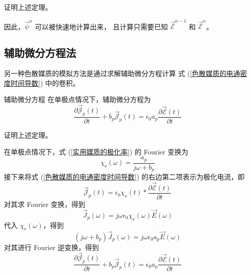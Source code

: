 \begin{exercise}
    证明上述定理。
\end{exercise}

\par 因此，$\vec{\psi}^n$ 可以被快速地计算出来，
且计算只需要已知 $\vec{\mathscr{E}}^{n-1}$ 和
$\vec{\mathscr{E}}^{n}$。

\subsection{辅助微分方程法}

\par 另一种色散媒质的模拟方法是通过求解辅助微分方程计算
式 (\ref{色散媒质的电通密度时间导数}) 中的卷积。

\begin{theorem}{辅助微分方程}
    在单极点情况下，辅助微分方程为
    \begin{equation}
        \frac{\partial \vec{\mathscr{J}}_p(t)}{\partial t}
        +b_p \vec{\mathscr{J}}_p(t)
        =\epsilon_0 a_p 
        \frac{\partial \vec{\mathscr{E}}(t)}{\partial t}
        \label{单极点色散媒质的辅助微分方程}
    \end{equation}
\end{theorem}

\begin{exercise}
    证明上述定理。
\end{exercise}

\begin{solution}
    在单极点情况下，式 (\ref{实用媒质的极化率}) 的 Fourier 变换为
    \begin{equation*}
        \chi_{\text{e}}(\omega)=
        \frac{a_p}{j\omega+b_p}
    \end{equation*}
    接下来将式 (\ref{色散媒质的电通密度时间导数}) 的右边第二项表示为极化电流，即
    \begin{equation*}
        \vec{\mathscr{J}}_p(t)=\epsilon_0 \chi_{\text{e}}(t) * 
        \frac{\partial \vec{\mathscr{E}}(t)}{\partial t}
    \end{equation*}
    对其求 Fourier 变换，得到
    \begin{equation*}
        \vec{J}_p(\omega)=
        j\omega\epsilon_0 \chi_{\text{e}}(\omega) \vec{E}(\omega)
    \end{equation*}
    代入 $\chi_{\text{e}}(\omega)$，得到
    \begin{equation*}
        (j\omega+b_p)\vec{J}_p(\omega)=
        j\omega\epsilon_0 a_p\vec{E}(\omega)
    \end{equation*}
    对其进行 Fourier 逆变换，得到
    \begin{equation*}
        \frac{\partial \vec{\mathscr{J}}_p(t)}{\partial t}
        +b_p \vec{\mathscr{J}}_p(t)
        =\epsilon_0 a_p 
        \frac{\partial \vec{\mathscr{E}}(t)}{\partial t}
    \end{equation*}
\end{solution}

